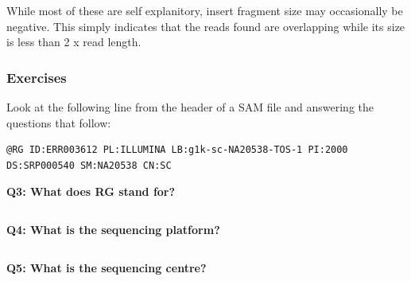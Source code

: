 \documentclass[11pt]{article}
\makeatletter
\newcommand{\boxspacing}{\kern\kvtcb@left@rule\kern\kvtcb@boxsep}
\newcommand{\prompt}[4]{
        {\ttfamily\llap{{\color{blue}\LARGE\faKeyboardO\hspace{3pt}#4}}\vspace{-\baselineskip}}
    }
\makeatother
\begin{document}
While most of these are self explanitory, insert fragment size may
occasionally be negative. This simply indicates that the reads found are
overlapping while its size is less than 2 x read length.

    \hypertarget{exercises}{%
\subsubsection{Exercises}\label{exercises}}

Look at the following line from the header of a SAM file and answering
the questions that follow:

\begin{verbatim}
@RG ID:ERR003612 PL:ILLUMINA LB:g1k-sc-NA20538-TOS-1 PI:2000 DS:SRP000540 SM:NA20538 CN:SC
\end{verbatim}

\textbf{Q3: What does RG stand for?}

    \begin{tcolorbox}[breakable, size=fbox, boxrule=1pt, pad at break*=1mm,colback=cellbackground, colframe=cellborder]
\prompt{In}{incolor}{ }{\boxspacing}
\begin{Verbatim}[commandchars=\\\{\}]

\end{Verbatim}
\end{tcolorbox}

    \textbf{Q4: What is the sequencing platform?}

    \begin{tcolorbox}[breakable, size=fbox, boxrule=1pt, pad at break*=1mm,colback=cellbackground, colframe=cellborder]
\prompt{In}{incolor}{ }{\boxspacing}
\begin{Verbatim}[commandchars=\\\{\}]

\end{Verbatim}
\end{tcolorbox}

    \textbf{Q5: What is the sequencing centre?}

    \begin{tcolorbox}[breakable, size=fbox, boxrule=1pt, pad at break*=1mm,colback=cellbackground, colframe=cellborder]
\prompt{In}{incolor}{ }{\boxspacing}
\begin{Verbatim}[commandchars=\\\{\}]

\end{Verbatim}
\end{tcolorbox}
\end{document}
